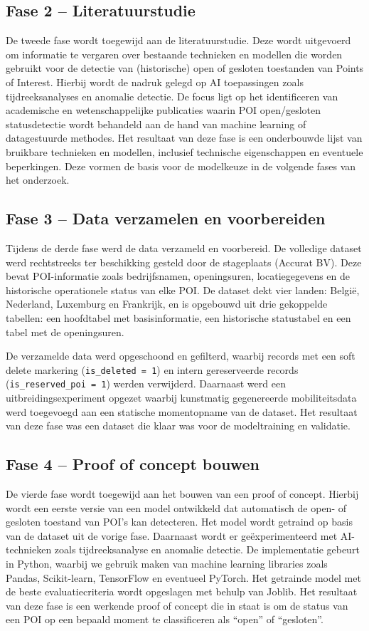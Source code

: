 \subsection{Fase 2 – Literatuurstudie}
De tweede fase wordt toegewijd aan de literatuurstudie. Deze wordt uitgevoerd om informatie te vergaren over bestaande technieken en modellen die worden gebruikt voor de detectie van (historische) open of gesloten toestanden van Points of Interest. Hierbij wordt de nadruk gelegd op AI toepassingen zoals tijdreeksanalyses en anomalie detectie. De focus ligt op het identificeren van academische en wetenschappelijke publicaties waarin POI open/gesloten statusdetectie wordt behandeld aan de hand van machine learning of datagestuurde methodes.
Het resultaat van deze fase is een onderbouwde lijst van bruikbare technieken en modellen, inclusief technische eigenschappen en eventuele beperkingen. Deze vormen de basis voor de modelkeuze in de volgende fases van het onderzoek.

\subsection{Fase 3 – Data verzamelen en voorbereiden}
Tijdens de derde fase werd de data verzameld en voorbereid. De volledige dataset werd rechtstreeks ter beschikking gesteld door de stageplaats (Accurat BV). Deze bevat POI-informatie zoals bedrijfsnamen, openingsuren, locatiegegevens en de historische operationele status van elke POI. De dataset dekt vier landen: België, Nederland, Luxemburg en Frankrijk, en is opgebouwd uit drie gekoppelde tabellen: een hoofdtabel met basisinformatie, een historische statustabel en een tabel met de openingsuren.

De verzamelde data werd opgeschoond en gefilterd, waarbij records met een soft delete markering (\texttt{is\_deleted = 1}) en intern gereserveerde records (\texttt{is\_reserved\_poi = 1}) werden verwijderd. Daarnaast werd een uitbreidingsexperiment opgezet waarbij kunstmatig gegenereerde mobiliteitsdata werd toegevoegd aan een statische momentopname van de dataset. Het resultaat van deze fase was een dataset die klaar was voor de modeltraining en validatie.

\subsection{Fase 4 – Proof of concept bouwen}
De vierde fase wordt toegewijd aan het bouwen van een proof of concept. Hierbij wordt een eerste versie van een model ontwikkeld dat automatisch de open- of gesloten toestand van POI's kan detecteren. Het model wordt getraind op basis van de dataset uit de vorige fase. Daarnaast wordt er geëxperimenteerd met AI-technieken zoals tijdreeksanalyse en anomalie detectie. De implementatie gebeurt in Python, waarbij we gebruik maken van machine learning libraries zoals Pandas, Scikit-learn, TensorFlow en eventueel PyTorch. Het getrainde model met de beste evaluatiecriteria wordt opgeslagen met behulp van Joblib. Het resultaat van deze fase is een werkende proof of concept die in staat is om de status van een POI op een bepaald moment te classificeren als “open” of “gesloten”.

